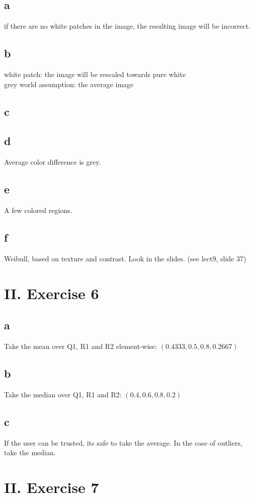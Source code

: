 \documentclass[a4paper,11pt]{article}
\begin{document}
	\subsection*{a} 
	if there are no white patches in the image, the resulting image will be incorrect.
	\subsection*{b} 
	white patch: the image will be rescaled towards pure white \\ 
	grey world assumption: the average image
	\subsection*{c}
	\subsection*{d}
	Average color difference is grey.
	\subsection*{e}
	A few colored regions.
	\subsection*{f}
	Weibull, based on texture and contrast. Look in the slides. (see lect9, slide 37)
	
	
	\section*{II. Exercise 6}
	\subsection*{a}
		Take the mean over Q1, R1 and R2 element-wise: $(0.4333, 0.5, 0.8, 0.2667)$
	\subsection*{b}
		Take the median over Q1, R1 and R2: $(0.4, 0.6, 0.8, 0.2)$
	\subsection*{c}
		If the user can be trusted, its safe to take the average. In the case of outliers, take the median.
		
	\section*{II. Exercise 7}	
	
	
\end{document}
